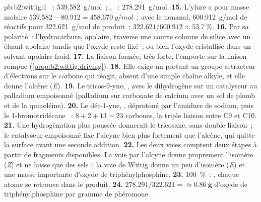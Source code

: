 \begin{solution}{pb:b2:wittig:1}
~: \qty{539.582}{g/mol}~; , ~: \qty{278.291}{g/mol}.
\textbf{15.} L'ylure  a pour masse molaire $539.582 - 80.912 = \qty{458.670}{g/mol}$~; avec le
nonanal, \qty{600.912}{g/mol} de réactifs pour \qty{322.621}{g/mol} de produit~: $322.621/600.912 \approx
53.7~\%$.
\textbf{16.} Par sa polarité~: l'hydrocarbure, apolaire, traverse une courte colonne de silice avec un
éluant apolaire tandis que l'oxyde reste fixé~; ou bien l'oxyde cristallise dans un solvant apolaire froid.
\textbf{17.} La liaison  formée, très forte, l'emporte sur la liaison  rompue
(\cref{prop:b2:wittig:driving}).
\textbf{18.} Elle exige un  portant un groupe attracteur d'électrons sur le carbone qui réagit,
absent d'une simple chaîne alkyle, et elle donne l'alcène (\textit{E}).
\textbf{19.} Le tricos-9-yne, , avec le dihydrogène sur un catalyseur au
palladium empoisonné (palladium sur carbonate de calcium avec un sel de plomb et de la quinoléine).
\textbf{20.} Le déc-1-yne, , déprotoné par l'amidure de sodium, puis le 1-bromotridécane
~: $8 + 2 + 13 = 23$ carbones, la triple liaison entre C9 et C10.
\textbf{21.} Une hydrogénation plus poussée donnerait le tricosane, sans double liaison~; le catalyseur
empoisonné fixe l'alcyne bien plus fortement que l'alcène, qui quitte la surface avant une seconde addition.
\textbf{22.} Les deux voies comptent deux étapes à partir de fragments disponibles. La voie par l'alcyne
donne proprement l'isomère (\textit{Z}) et ne laisse que des sels~; la voie de Wittig donne un peu
d'isomère (\textit{E}) et une masse importante d'oxyde de triphénylphosphine.
\textbf{23.} 100~\%~: , chaque atome se retrouve dans le produit.
\textbf{24.} $278.291/322.621 = \boldsymbol{\approx \qty{0.86}{g}}$ d'oxyde de triphénylphosphine par
gramme de phéromone.
\end{solution}
